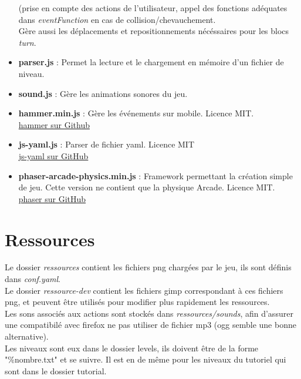 \documentclass[11pt]{article}
\begin{document}
\begin{itemize}
		(prise en compte des actions de l'utilisateur, appel des 
		fonctions adéquates dans {\em eventFunction} en cas de 
		collision/chevauchement.\\
		Gère aussi les déplacements et repositionnements nécéssaires 
		pour les blocs {\em turn}.\\
	\item
		\textbf{parser.js} : Permet la lecture et le chargement en 
		mémoire d'un fichier de niveau.\\
	\item
		\textbf{sound.js} : Gère les animations sonores du jeu.\\
	\item
		\textbf{hammer.min.js} : Gère les événements sur mobile. Licence
		MIT.\\
		\href{https://github.com/EightMedia/hammer.js}
		{hammer sur Github}\\
	\item
		\textbf{js-yaml.js} : Parser de fichier yaml. Licence MIT\\
		\href{https://github.com/nodeca/js-yaml}{js-yaml sur GitHub}\\
	\item
		\textbf{phaser-arcade-physics.min.js} : Framework permettant
		la création simple de jeu. Cette version ne contient que la 
		physique Arcade. Licence MIT.\\
		\href{https://github.com/photonstorm/phaser}
		{phaser sur GitHub}\\
\end{itemize}
\section {Ressources}
Le dossier {\em ressources} contient les fichiers png chargées par le jeu,
ils sont définis dans {\em conf.yaml}.\\
Le dossier {\em ressource-dev} contient les fichiers gimp correspondant à
ces fichiers png, et peuvent être utilisés pour modifier plus rapidement 
les ressources.\\
Les sons associés aux actions sont stockés dans {\em ressources/sounds}, afin 
d'assurer une compatibilé avec firefox ne pas utiliser de fichier mp3 (ogg
semble une bonne alternative).\\
Les niveaux sont eux dans le dossier levels, ils doivent être de la forme 
"\%nombre.txt" et se suivre. Il est en de même pour les niveaux du tutoriel 
qui sont dans le dossier tutorial.\\
\end{document}

